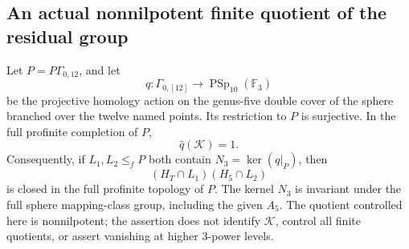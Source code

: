 \subsection*{An actual nonnilpotent finite quotient of the residual group}

Let $P=P\Gamma_{0,12}$, and let
\[
 q:\Gamma_{0,[12]}\longrightarrow
       \operatorname{PSp}_{10}(\mathbb F_3)
                                                               \tag{B.62.1}
\]
be the projective homology action on the genus-five double
cover of the sphere branched over the twelve named points.
Its restriction to $P$ is surjective.  In the full profinite
completion of $P$,
\[
                \widehat q(\mathcal K)=1.                    \tag{B.62.2}
\]
Consequently, if $L_1,L_2\leq_f P$ both contain
$N_3=\ker(q|_P)$, then
\[
                 (H_T\cap L_1)(H_5\cap L_2)                 \tag{B.62.3}
\]
is closed in the full profinite topology of $P$.
The kernel $N_3$ is invariant under the full sphere
mapping-class group, including the given $A_5$.
The quotient controlled here is nonnilpotent; the assertion
does not identify $\mathcal K$, control all finite quotients,
or assert vanishing at higher $3$-power levels.

